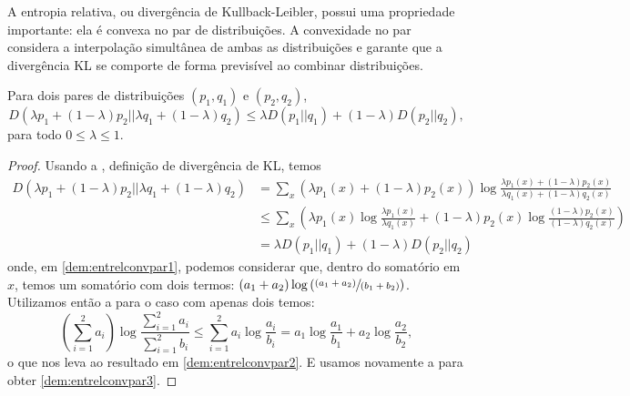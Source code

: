 A entropia relativa, ou divergência de Kullback-Leibler, possui uma propriedade importante: ela é convexa no par de distribuições.
A convexidade no par considera a interpolação simultânea de ambas as distribuições e garante que a divergência KL se comporte de forma previsível ao combinar distribuições.

\begin{theorem}
Para dois pares de distribuições $(p_1, q_1)$ e $(p_2, q_2)$, 
\begin{equation}\label{eq:entrelconvpar}
D(\lambda p_1 + (1 - \lambda) p_2 || \lambda q_1 + (1- \lambda)q_2) \leq \lambda D(p_1 || q_1) + (1- \lambda) D(p_2 || q_2) ,
\end{equation}
para todo $0 \leq \lambda \leq 1$.
\end{theorem}
\begin{proof}
Usando a , definição de divergência de KL, temos
\begin{subequations}\label{dem:entrelconvpar}
\begin{align}
    D(\lambda p_1 + (1 - \lambda) p_2 || \lambda q_1 + (1- \lambda)q_2) &= \sum_x (\lambda p_1(x) + (1 - \lambda) p_2(x) ) \log \frac{\lambda p_1(x) + (1 - \lambda) p_2(x)}{\lambda q_1(x) + (1 - \lambda) q_2(x)} \label{dem:entrelconvpar1} \\
									&\leq \sum_x \left( \lambda p_1(x) \log \frac{\lambda p_1(x)}{\lambda q_1(x)} + (1 - \lambda) p_2(x) \log \frac{(1 - \lambda) p_2(x)}{(1-\lambda) q_2(x)} \right) \label{dem:entrelconvpar2} \\
									&= \lambda D(p_1 || q_1) + (1 - \lambda) D(p_2 || q_2) \label{dem:entrelconvpar3}
\end{align}
\end{subequations}
onde, em \ref{dem:entrelconvpar1}, podemos considerar que, dentro do somatório em $x$, temos um somatório com dois termos: $(a_1+a_2) \log \left( \sfrac{(a_1+a_2)}{(b_1 + b_2)} \right)$.
Utilizamos então a  para o caso com apenas dois temos:
\begin{equation}
\left( \sum_{i=1}^2 a_i \right) \log \frac{\sum_{i=1}^2 a_i}{\sum_{i=1}^{2} b_i} \leq \sum_{i=1}^2 a_i \log \frac{a_i}{b_i} =  a_1 \log \frac{a_1}{b_1} + a_2 \log \frac{a_2}{b_2},
\end{equation}
o que nos leva ao resultado em \ref{dem:entrelconvpar2}. E usamos novamente a  para obter \ref{dem:entrelconvpar3}.
\end{proof}




